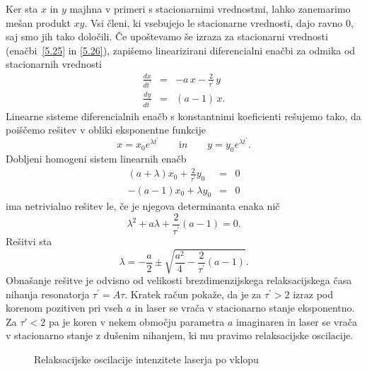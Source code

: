 Ker sta $x$ in $y$ majhna v primeri s stacionarnimi vrednostmi, lahko
zanemarimo mešan produkt $xy$. Vsi členi, ki vsebujejo le stacionarne vrednosti,
dajo ravno 0, saj smo jih tako določili. Če upoštevamo še izraza 
za stacionarni vrednosti (enačbi~\ref {5.25} in \ref{5.26}), 
zapišemo linearizirani diferencialni enačbi za odmika od stacionarnih vrednosti 
\begin{eqnarray}
\frac{dx}{dt^{\prime }} &=&-a\,x-\frac{2}{\tau ^{\prime }}\,y  \label{5.28}
\\
\frac{dy}{dt^{\prime }} &=&(a-1)\,x.
\end{eqnarray}
Linearne sisteme diferencialnih enačb s konstantnimi
koeficienti rešujemo tako, da poiščemo rešitev v obliki eksponentne funkcije 
\begin{equation}
x=x_{0}e^{\lambda t^{\prime }} \qquad {\mathrm in } \qquad 
y=y_{0}e^{\lambda t^{\prime }}.
\label{5.29}
\end{equation}
Dobljeni homogeni sistem linearnih enačb 
\begin{eqnarray}
(a+\lambda )x_{0}+\frac{2}{\tau ^{\prime }}y_{0} &=&0  \label{5.30} \\
-(a-1)x_{0}+\lambda y_{0} &=&0
\end{eqnarray}
ima netrivialno rešitev le, če je njegova determinanta enaka nič
\begin{equation}
\lambda ^{2}+a\lambda +\frac{2}{\tau ^{\prime }}(a-1)=0.  
\label{5.301}
\end{equation}
Rešitvi sta 
\begin{equation}
\lambda =-\frac{a}{2}\pm \sqrt{\frac{a^{2}}{4}-\frac{2}{\tau ^{\prime }}(a-1)}.
\label{5.31}
\end{equation}
Obnašanje rešitve je odvisno od velikosti brezdimenzijskega relaksacijskega
časa nihanja resonatorja $\tau ^{\prime }=A\tau $. Kratek račun pokaže, da je 
za $\tau ^{\prime }>2$ izraz pod korenom pozitiven pri vseh $a$ in laser 
se vrača v stacionarno stanje eksponentno. Za $\tau' <2$ pa je koren v nekem območju
parametra $a$ imaginaren in laser se vrača v stacionarno stanje z
dušenim nihanjem, ki mu pravimo relaksacijske oscilacije.

\begin{figure}[h]
\centering
\def\svgwidth{90truemm} 

\caption{Relaksacijske oscilacije intenzitete laserja po vklopu}
\label{fig:relax}
\end{figure}

